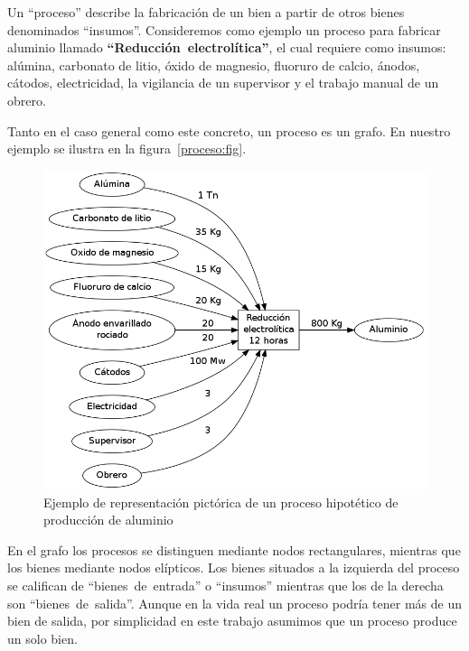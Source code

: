\documentclass[11pt,spanish,letter]{article}
\begin{document}
   Un ``proceso'' describe la fabricación de un bien a partir de otros
   bienes denominados ``insumos''. Consideremos como ejemplo un proceso
   para fabricar aluminio llamado \mbox{\bf ``Reducción
   electrolítica''}, el cual requiere como insumos: alúmina, carbonato
   de litio, óxido de magnesio, fluoruro de calcio, ánodos, cátodos,
   electricidad, la vigilancia de un supervisor y el trabajo manual de
   un obrero.

   Tanto en el caso general como este concreto, un proceso es un
   grafo. En nuestro ejemplo se ilustra en la figura~\ref{proceso:fig}.

   \begin{figure}[htb!]
    \begin{center}
     \includegraphics[scale=0.3]{alumina.png}
    \end{center}
    \caption{Ejemplo de representación pictórica de un  proceso
    hipotético de producción de aluminio} 
    \label{proceso:fig}
    \label{aluminio:fig}
   \end{figure}

   En el grafo los procesos se distinguen mediante nodos rectangulares,
   mientras que los bienes mediante nodos elípticos. Los bienes situados
   a la izquierda del proceso se califican de \mbox{``bienes de
   entrada''} o ``insumos'' mientras que los de la derecha son
   \mbox{``bienes de salida''}. Aunque en la vida real un proceso podría
   tener más de un bien de salida, por simplicidad en este trabajo
   asumimos que un proceso produce un solo bien.
\end{document}

